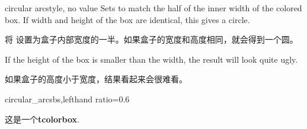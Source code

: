 



\begin{docTcbKey}[][doc new=2015-05-05]{circular arc}{}{style, no value}
  Sets  to match the half of the inner width of the colored box.
  If width and height of the box are identical, this gives a circle.
  
  将  设置为盒子内部宽度的一半。如果盒子的宽度和高度相同，就会得到一个圆。
  \begin{marker}
  If the height of the box is smaller than the width, the result will look
  quite ugly.
  
  如果盒子的高度小于宽度，结果看起来会很难看。   
  \end{marker}
  \begin{exdispExample*}{circular_arc}{sbs,lefthand ratio=0.6}
  \begin{tcolorbox}[width=3cm,
  colback=red!5!white,
  colframe=red!75!black,
  halign=center,valign=center,
  square,circular arc]
  这是一个\textbf{tcolorbox}.
  \end{tcolorbox}
  \end{exdispExample*}
  \end{docTcbKey}
  
